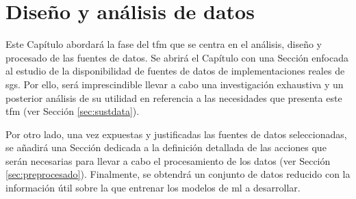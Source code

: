 \chapter{Diseño y análisis de datos}
\label{ch:analisis}

Este Capítulo abordará la fase del \gls{tfm} que se centra en el análisis, diseño y procesado de las fuentes de datos.
Se abrirá el Capítulo con una Sección enfocada al estudio de la disponibilidad de fuentes de datos de implementaciones reales de \gls{sg}s. Por ello, será imprescindible llevar a cabo una investigación exhaustiva y un posterior análisis de su utilidad en referencia a las necesidades que presenta este \gls{tfm} (ver Sección \ref{sec:sustdata}).

\vspace{3mm}

Por otro lado, una vez expuestas y justificadas las fuentes de datos seleccionadas, se añadirá una Sección dedicada a la definición detallada de las acciones que serán necesarias para llevar a cabo el procesamiento de los datos (ver Sección \ref{sec:preprocesado}). Finalmente, se obtendrá un conjunto de datos reducido con la información útil sobre la que entrenar los modelos de \gls{ml} a desarrollar. 

\vspace{3mm}

 

